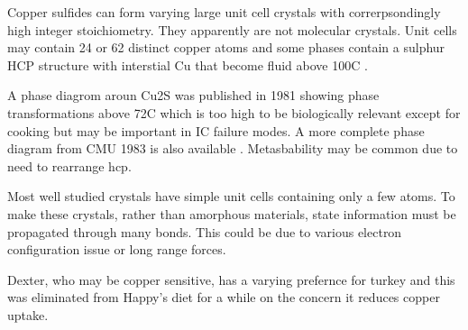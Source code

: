 Copper sulfides can form varying large unit cell crystals 
with correrpsondingly high integer stoichiometry. 
They apparently are not molecular crystals.
Unit cells may contain 24 or 62 distinct copper atoms and some phases
contain a sulphur HCP structure with interstial Cu that become
fluid above 100C \cite{Evans_crystal_structures_}.

A phase diagrom aroun Cu2S was published in 1981
showing phase transformations above 72C
\cite{Evans1981CopperCI} which is too high to be biologically
relevant except for cooking but may be important
in IC failure modes. 
A more complete phase diagram from CMU 1983 is also available
\cite{Chakrabarti_Laughlin_Copper_1983}.
Metasbability may be common due to need to rearrange hcp.


Most well studied crystals have simple unit cells containing
only a few atoms. To make these crystals, rather than amorphous
materials, state information must be propagated through
many bonds. This could be due to various electron configuration
issue or long range forces. 


\begin{comment}
\begin{figure}[ht]
\begin{align}
\cee{H2O &<=> H^{+}_{(aq)} + OH^{-}_{(aq)}} \\
\cee{Cl_{2} + 2OH^{-}  & <=> Cl^{-} + O-Cl + H_{2}O_{l} \label{r:ecbleach} } \\
\cee{Cl_{2} + 2NaOH & -> NaCl + NaClO + H_{2}O \label{r:hypochlorate}}\\
\cee{NaCl + 3H_{2}O & <=> NaClO_3 + 3H_2 \label{r:chlorate}} \\
\cee{ H_{2}O_{2} + NaClO & -> NaCl + H_{2}O + O_{2} \label{r:bleachperoxide}}\\
\end{align}
\caption{ \label{fig:reacts} test to see how chemfig works.  wtf is outer par mode?  Some reactions thought to be relevant to generation, decay, and
efficacy of electrolyzed water solutions. }
\end{figure}

\end{comment}

Dexter, who may be copper sensitive, has a varying prefernce
for turkey and this was eliminated from Happy's diet for a while
on the concern it reduces copper uptake.


